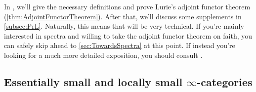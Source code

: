 In , we'll give the necessary definitions and prove Lurie's adjoint functor theorem (\cref{thm:AdjointFunctorTheorem}). After that, we'll discuss some supplements in \cref{subsec:PrL}. Naturally, this means that  will be very technical. If you're mainly interested in spectra and willing to take the adjoint functor theorem on faith, you can safely skip ahead to \cref{sec:TowardsSpectra} at this point. If instead you're looking for a much more detailed exposition, you should consult \cite[\S\href{https://people.math.harvard.edu/~lurie/papers/HTT.pdf\#page=332}{5}]{HTT}.


\subsection{Essentially small and locally small \texorpdfstring{$\infty$}{Infinity}-categories}\label{subsec:EssentiallySmall}

